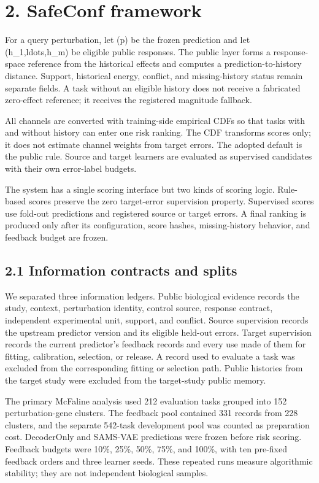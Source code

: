 \documentclass[journal]{IEEEtran}
\begin{document}
\section{2. SafeConf framework}

For a query perturbation, let (p) be the frozen prediction and let (h\_1,ldots,h\_m) be eligible public responses. The public layer forms a response-space reference from the historical effects and computes a prediction-to-history distance. Support, historical energy, conflict, and missing-history status remain separate fields. A task without an eligible history does not receive a fabricated zero-effect reference; it receives the registered magnitude fallback.

All channels are converted with training-side empirical CDFs so that tasks with and without history can enter one risk ranking. The CDF transforms scores only; it does not estimate channel weights from target errors. The adopted default is the public rule. Source and target learners are evaluated as supervised candidates with their own error-label budgets.

The system has a single scoring interface but two kinds of scoring logic. Rule-based scores preserve the zero target-error supervision property. Supervised scores use fold-out predictions and registered source or target errors. A final ranking is produced only after its configuration, score hashes, missing-history behavior, and feedback budget are frozen.

\subsection{2.1 Information contracts and splits}

We separated three information ledgers. Public biological evidence records the study, context, perturbation identity, control source, response contract, independent experimental unit, support, and conflict. Source supervision records the upstream predictor version and its eligible held-out errors. Target supervision records the current predictor's feedback records and every use made of them for fitting, calibration, selection, or release. A record used to evaluate a task was excluded from the corresponding fitting or selection path. Public histories from the target study were excluded from the target-study public memory.

The primary McFaline analysis used 212 evaluation tasks grouped into 152 perturbation-gene clusters. The feedback pool contained 331 records from 228 clusters, and the separate 542-task development pool was counted as preparation cost. DecoderOnly and SAMS-VAE predictions were frozen before risk scoring. Feedback budgets were 10\%, 25\%, 50\%, 75\%, and 100\%, with ten pre-fixed feedback orders and three learner seeds. These repeated runs measure algorithmic stability; they are not independent biological samples.
\end{document}
